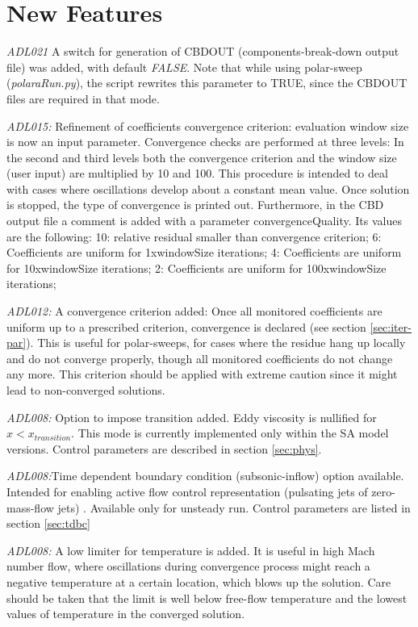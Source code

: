 \documentclass[12pt,epsf,colordvi]{article}
\begin{document}
\section{New Features}
%
\begin{description}
%
\item{\it ADL021 } A switch for generation of CBDOUT (components-break-down output file) was added, with default {\it FALSE}.
     Note that while using polar-sweep ({\it polaraRun.py}), the script rewrites this parameter to TRUE, since the CBDOUT files are required in that mode.
%
\item{\it ADL015: }Refinement of coefficients convergence criterion: evaluation window size is now an input parameter. Convergence checks are performed at three levels: In the second and third levels both the convergence criterion and the window size (user input) are multiplied by 10 and 100. This procedure is intended to deal with cases where oscillations develop about a constant mean value. Once solution is stopped, the type of convergence is printed out. Furthermore, in the CBD output file a comment is added with a parameter convergenceQuality. Its values are the following:
10: relative residual smaller than convergence criterion; 6: Coefficients are uniform for 1xwindowSize iterations;
4: Coefficients are uniform for 10xwindowSize iterations; 2: Coefficients are uniform for 100xwindowSize iterations;
%
%
\item{\it ADL012: } A convergence criterion added: Once all monitored coefficients are uniform up to a prescribed criterion, 
convergence is declared (see section \ref{sec:iter-par}). 
This is useful for polar-sweeps, for cases where the residue hang up locally and do not converge properly,
though all monitored coefficients do not change any more. This criterion should be applied with extreme caution since it might
lead to non-converged solutions.
%
\item{\it ADL008:} Option to impose  transition added. Eddy viscosity is nullified for \(x< x_{transition}\). This mode is currently implemented only within the SA model versions. Control parameters are described in section \ref{sec:phys}.
%
\item{\it ADL008:}Time dependent boundary condition (subsonic-inflow) option available. Intended for enabling active flow control representation (pulsating jets of zero-mass-flow jets) . Available only for unsteady run. Control parameters are listed in section \ref{sec:tdbc}
%
\item{\it ADL008:} A low limiter for temperature is added. It is useful in high Mach number flow, where oscillations during convergence process might reach a negative temperature at a certain location, which blows up the solution. Care should be taken that the limit is well below free-flow temperature and the lowest values of temperature in the converged solution.

\end{description}
\end{document}
